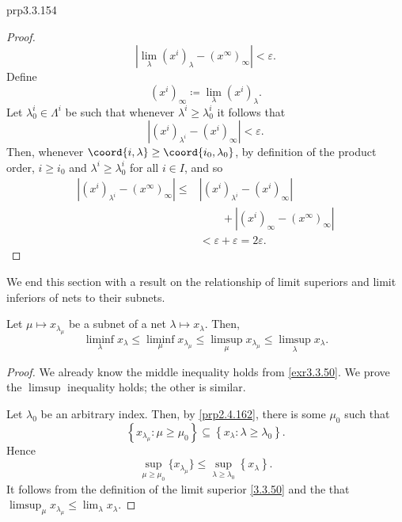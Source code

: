 \begin{prp}{}{prp3.3.154}
\begin{proof}
\begin{equation}
\left| \lim _\lambda (x^i)_\lambda -(x^\infty )_\infty \right| <\varepsilon .
\end{equation}
Define
\begin{equation}
(x^i)_\infty \coloneqq \lim _\lambda (x^i)_\lambda .
\end{equation}
Let $\lambda ^i_0\in \Lambda ^i$ be such that whenever $\lambda ^i\geq \lambda ^i_0$ it follows that
\begin{equation}
\left| (x^i)_{\lambda ^i}-(x^i)_\infty \right| <\varepsilon .
\end{equation}
Then, whenever $\coord{i,\lambda }\geq \coord{i_0,\lambda _0}$, by definition of the product order, $i\geq i_0$ and $\lambda ^i\geq \lambda ^i_0$ for all $i\in I$, and so
\begin{equation}
\begin{split}
\left| (x^i)_{\lambda ^i}-(x^\infty )_\infty \right| \leq & \left| (x^i)_{\lambda ^i}-(x^i)_\infty \right| \\ & \qquad +\left| (x^i)_\infty -(x^\infty )_\infty \right| \\
& <\varepsilon +\varepsilon =2\varepsilon .
\end{split}
\end{equation}
\end{proof}
\end{prp}

We end this section with a result on the relationship of limit superiors and limit inferiors of nets to their subnets.
\begin{prp}{}{}
Let $\mu \mapsto x_{\lambda _\mu}$ be a subnet of a net $\lambda \mapsto x_\lambda$.  Then,
\begin{equation}
\liminf _\lambda x_\lambda \leq \liminf _\mu x_{\lambda _\mu}\leq \limsup _\mu x_{\lambda _\mu}\leq \limsup _\lambda x_\lambda .
\end{equation}
\begin{proof}
We already know the middle inequality holds from \cref{exr3.3.50}.  We prove the $\limsup$ inequality holds; the other is similar.

Let $\lambda _0$ be an arbitrary index.  Then, by \cref{prp2.4.162}, there is some $\mu _0$ such that
\begin{equation}
\left\{ x_{\lambda _\mu}:\mu \geq \mu _0\right\} \subseteq \left\{ x_\lambda :\lambda \geq \lambda _0\right\} .
\end{equation}
Hence
\begin{equation}
\sup _{\mu \geq \mu _0}\{ x_{\lambda _\mu}\} \leq \sup _{\lambda \geq \lambda _0}\left\{ x_\lambda \right\} .
\end{equation}
It follows from the definition of the limit superior \eqref{3.3.50} and the  that $\limsup _\mu x_{\lambda _\mu}\leq \lim _\lambda x_\lambda$.
\end{proof}
\end{prp}

